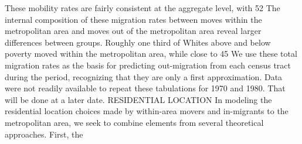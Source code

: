 \documentclass[12pt,a4paper]{article}
\begin{document}
These mobility rates are fairly consistent at the aggregate level, with 52%
The internal composition of these migration rates between moves within the metropolitan area and moves out of the metropolitan area reveal larger differences between groups.  Roughly one third of Whites above and below poverty moved within the metropolitan area, while close to 45%
We use these total migration rates as the basis for predicting
out-migration from each census tract during the period,
recognizing that they are only a first approximation.  Data were
not readily available to repeat these tabulations for 1970 and
1980.  That will be done at a later date. RESIDENTIAL LOCATION In
modeling the residential location choices made by within-area
movers and in-migrants to the metropolitan area, we seek to
combine elements from several theoretical approaches.  First, the
\end{document}
